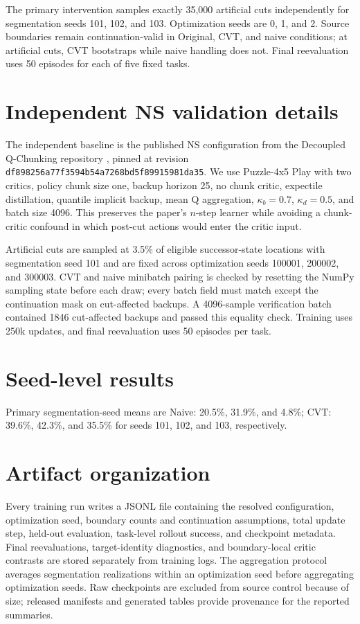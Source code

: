 The primary intervention samples exactly 35,000 artificial cuts independently for segmentation seeds 101, 102, and 103. Optimization seeds are 0, 1, and 2. Source boundaries remain continuation-valid in Original, CVT, and naive conditions; at artificial cuts, CVT bootstraps while naive handling does not. Final reevaluation uses 50 episodes for each of five fixed tasks.

\section{Independent NS validation details}
\label{app:independent}

The independent baseline is the published NS configuration from the Decoupled Q-Chunking repository \cite{li2026dqc}, pinned at revision \texttt{df898256a77f3594b54a7268bd5f89915981da35}. We use Puzzle-4x5 Play with two critics, policy chunk size one, backup horizon 25, no chunk critic, expectile distillation, quantile implicit backup, mean Q aggregation, $\kappa_b=0.7$, $\kappa_d=0.5$, and batch size 4096. This preserves the paper's $n$-step learner while avoiding a chunk-critic confound in which post-cut actions would enter the critic input.

Artificial cuts are sampled at 3.5\% of eligible successor-state locations with segmentation seed 101 and are fixed across optimization seeds 100001, 200002, and 300003. CVT and naive minibatch pairing is checked by resetting the NumPy sampling state before each draw; every batch field must match except the continuation mask on cut-affected backups. A 4096-sample verification batch contained 1846 cut-affected backups and passed this equality check. Training uses 250k updates, and final reevaluation uses 50 episodes per task.

\section{Seed-level results}
\label{app:seeds}



Primary segmentation-seed means are Naive: 20.5\%, 31.9\%, and 4.8\%; CVT: 39.6\%, 42.3\%, and 35.5\% for seeds 101, 102, and 103, respectively.

\section{Artifact organization}
\label{app:artifacts}

Every training run writes a JSONL file containing the resolved configuration, optimization seed, boundary counts and continuation assumptions, total update step, held-out evaluation, task-level rollout success, and checkpoint metadata. Final reevaluations, target-identity diagnostics, and boundary-local critic contrasts are stored separately from training logs. The aggregation protocol averages segmentation realizations within an optimization seed before aggregating optimization seeds. Raw checkpoints are excluded from source control because of size; released manifests and generated tables provide provenance for the reported summaries.
